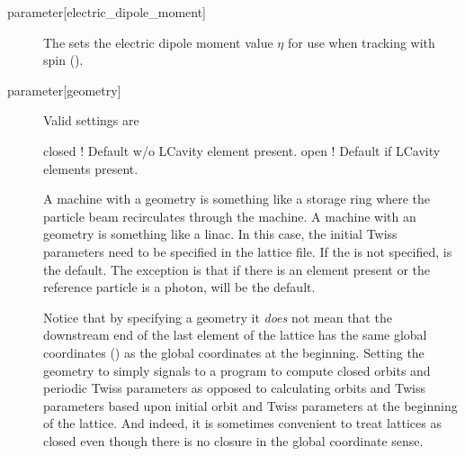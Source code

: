 \begin{description}
  \item[{parameter[electric_dipole_moment]}] \Newline
The  sets the electric dipole moment value $\eta$ for use
when tracking with spin (). 
  \item[{parameter[geometry]}] \Newline
Valid  settings are
\begin{example}
  closed  ! Default w/o LCavity element present.
  open    ! Default if LCavity elements present.
\end{example}
A machine with a  geometry is something like a storage ring
where the particle beam recirculates through the machine.  A machine
with an  geometry is something like a linac.  In this case,
the initial Twiss parameters need to be specified in the lattice
file. If the  is not specified,  is the
default. The exception is that if there is an  element
present or the reference particle is a photon,  will be the
default.

Notice that by specifying a  geometry it {\em does} not
mean that the downstream end of the last element of the lattice has
the same global coordinates () as the global
coordinates at the beginning. Setting the geometry to 
simply signals to a program to compute closed orbits and periodic
Twiss parameters as opposed to calculating orbits and Twiss parameters
based upon initial orbit and Twiss parameters at the beginning of the
lattice. And indeed, it is sometimes convenient to treat lattices as
closed even though there is no closure in the global coordinate sense.


\end{description}
